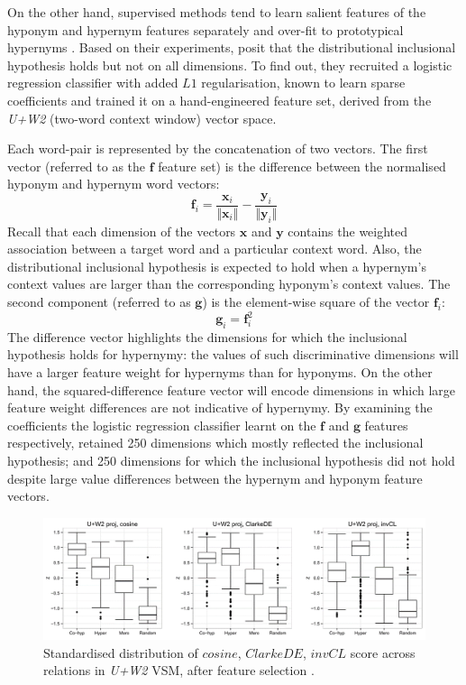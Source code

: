 On the other hand, supervised methods tend to learn salient features of the hyponym and hypernym features separately and over-fit to prototypical hypernyms \citep{levy2015supervised}.  Based on their experiments, \citet{roller2014inclusive} posit that the distributional inclusional hypothesis holds but not on all dimensions.  To find out, they recruited a logistic regression classifier with added $L1$ regularisation, known to learn sparse coefficients and trained it on a hand-engineered feature set, derived from the \textit{U+W2} (two-word context window) vector space.  

Each word-pair is represented by the concatenation of two vectors.  The first vector (referred to as the $\bm{f}$ feature set) is the difference between the normalised hyponym and hypernym word vectors: 
\[
\bm{f}_i = \frac{\bm{x}_i}{\Vert\bm{x}_i\Vert} - \frac{\bm{y}_i}{\Vert\bm{y}_i\Vert}
\]
Recall that each dimension of the vectors $\bm{x}$ and $\bm{y}$ contains the weighted association between a target word and a particular context word.  Also, the distributional inclusional hypothesis is expected to hold when a hypernym’s context values are larger than the corresponding hyponym’s context values.  The second component (referred to as $\bm{g}$) is the element-wise square of the vector $\bm{f}_i$:
\[
\bm{g}_i = \bm{f}_i^2
\]
The difference vector highlights the dimensions for which the inclusional hypothesis holds for hypernymy: the values of such discriminative dimensions will have a larger feature weight for hypernyms than for hyponyms.  On the other hand, the squared-difference feature vector will encode dimensions in which large feature weight differences are not indicative of hypernymy.  By examining the coefficients the logistic regression classifier learnt on the $\bm{f}$ and $\bm{g}$ features respectively, \citeauthor{roller2014inclusive} retained 250 dimensions which mostly reflected the inclusional hypothesis; and 250 dimensions for which the inclusional hypothesis did not hold despite large value differences between the hypernym and hyponym feature vectors. 
\begin{figure}[ht!] 
  \centering
  \includegraphics[width=1.\linewidth]{images/std_distrib_invCL_post_feature_selection.png}
  \caption{Standardised distribution of $cosine$, $ClarkeDE$, $invCL$ score across relations in \textit{U+W2} VSM, after feature selection \citep{roller2014inclusive}.}
  \label{fig:std_invCL_boxplot_500dim}
\end{figure}

